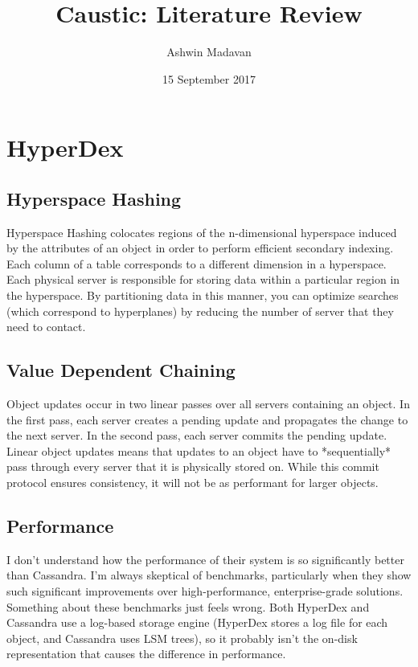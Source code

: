\documentclass[12pt]{article}
\begin{document}
\title{Caustic: Literature Review}
\author{Ashwin Madavan}
\date{15 September 2017}
\maketitle

\section{HyperDex}

  \subsection{Hyperspace Hashing}
  Hyperspace Hashing colocates regions of the n-dimensional hyperspace induced by the attributes of 
  an object in order to perform efficient secondary indexing. Each column of a table corresponds to 
  a different dimension in a hyperspace. Each physical server is responsible for storing data within 
  a particular region in the hyperspace. By partitioning data in this manner, you can optimize 
  searches (which correspond to hyperplanes) by reducing the number of server that they need to 
  contact.

  \subsection{Value Dependent Chaining}
  Object updates occur in two linear passes over all servers containing an object. In the first 
  pass, each server creates a pending update and propagates the change to the next server. In the 
  second pass, each server commits the pending update. Linear object updates means that updates to 
  an object have to *sequentially* pass through every server that it is physically stored on. While 
  this commit protocol ensures consistency, it will not be as performant for larger objects.

  \subsection{Performance}
  I don't understand how the performance of their system is so significantly better than Cassandra. 
  I'm always skeptical of benchmarks, particularly when they show such significant improvements over 
  high-performance, enterprise-grade solutions. Something about these benchmarks just feels wrong. 
  Both HyperDex and Cassandra use a log-based storage engine (HyperDex stores a log file for each 
  object, and Cassandra uses LSM trees), so it probably isn't the on-disk representation that causes 
  the difference in performance.
\end{document}
